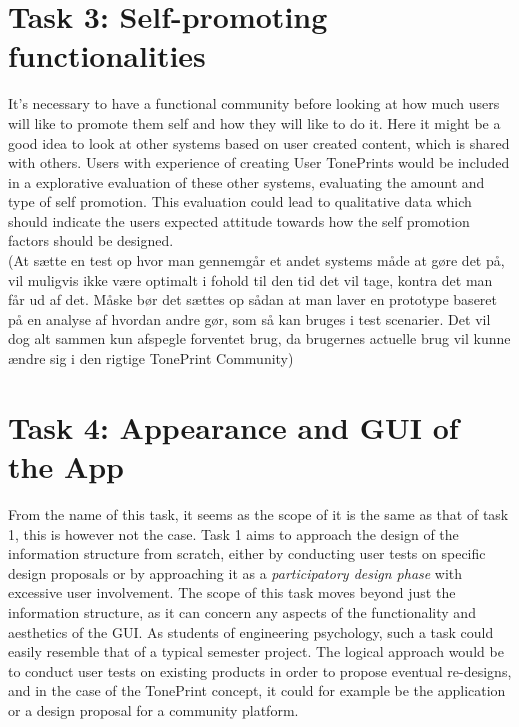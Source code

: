 \section{Task 3: Self-promoting functionalities}
\label{Task3}
It's necessary to have a functional community before looking at how much users will like to promote them self and how they will like to do it. Here it might be a good idea to look at other systems based on user created content, which is shared with others. Users with experience of creating User TonePrints would be included in a explorative evaluation of these other systems, evaluating the amount and type of self promotion. This evaluation could lead to qualitative data which should indicate the users expected attitude towards how the self promotion factors should be designed.\\
(At sætte en test op hvor man gennemgår et andet systems måde at gøre det på, vil muligvis ikke være optimalt i fohold til den tid det vil tage, kontra det man får ud af det. Måske bør det sættes op sådan at man laver en prototype baseret på en analyse af hvordan andre gør, som så kan bruges i test scenarier. Det vil dog alt sammen kun afspegle forventet brug, da brugernes actuelle brug vil kunne ændre sig i den rigtige TonePrint Community)


\section{Task 4: Appearance and GUI of the App}
\label{Task4}
From the name of this task, it seems as the scope of it is the same as that of task 1, this is however not the case. Task 1 aims to approach the design of the information structure from scratch, either by conducting user tests on specific design proposals or by approaching it as a \textit{participatory design phase} with excessive user involvement. The scope of this task moves beyond just the information structure, as it can concern any aspects of the functionality and aesthetics of the GUI. As students of engineering psychology, such a task could easily resemble that of a typical semester project. The logical approach would be to conduct user tests on existing products in order to propose eventual re-designs, and in the case of the TonePrint concept, it could for example be the application or a design proposal for a community platform.\\

